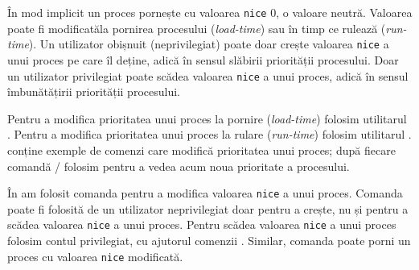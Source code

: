 În mod implicit un proces pornește cu valoarea \texttt{nice} 0, o valoare neutră.
Valoarea poate fi modificatăla pornirea procesului (\textit{load-time}) sau în timp ce rulează (\textit{run-time}).
Un utilizator obișnuit (neprivilegiat) poate doar crește valoarea \texttt{nice} a unui proces pe care îl deține, adică în sensul slăbirii priorității procesului.
Doar un utilizator privilegiat poate scădea valoarea \texttt{nice} a unui proces, adică în sensul îmbunătățirii priorității procesului.

Pentru a modifica prioritatea unui proces la pornire (\textit{load-time}) folosim utilitarul .
Pentru a modifica prioritatea unui proces la rulare (\textit{run-time}) folosim utilitarul .
 conține exemple de comenzi care modifică prioritatea unui proces;
după fiecare comandă  /  folosim  pentru a vedea acum noua prioritate a procesului.

În  am folosit comanda  pentru a modifica valoarea \texttt{nice} a unui proces.
Comanda poate fi folosită de un utilizator neprivilegiat doar pentru a crește, nu și pentru a scădea valoarea \texttt{nice} a unui proces.
Pentru scădea valoarea \texttt{nice} a unui proces folosim contul privilegiat, cu ajutorul comenzii .
Similar, comanda  poate porni un proces cu valoarea \texttt{nice} modificată.


